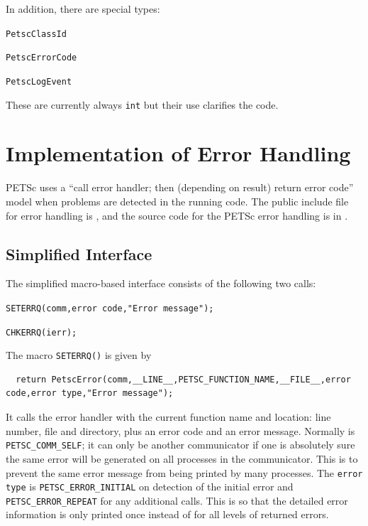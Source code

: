 In addition, there are special types:
\begin{tightitemize}
  \item \lstinline{PetscClassId}
  \item \lstinline{PetscErrorCode}
  \item \lstinline{PetscLogEvent}
\end{tightitemize}
These are currently always \lstinline{int} but their use clarifies the code.

\section{Implementation of Error Handling}

PETSc  uses a ``call error handler; then (depending on result) return
error code'' model when problems are detected in the running code.
The public include file for error handling is
 \href{http://www.mcs.anl.gov/petsc/petsc-master/include/petscerror.h.html}{}, 
 and the source code for the PETSc error handling is in .

\subsection{Simplified Interface}

The simplified macro-based interface consists of the following two calls:
\begin{tightitemize}
  \item \lstinline{SETERRQ(comm,error code,"Error message");}
  \item \lstinline{CHKERRQ(ierr);}
\end{tightitemize}

The macro \lstinline{SETERRQ()} is given by
\begin{lstlisting}
  return PetscError(comm,__LINE__,PETSC_FUNCTION_NAME,__FILE__,error code,error type,"Error message");
\end{lstlisting}
It calls the error handler with the current function name and location: line number,
file and directory, plus an error code and an error message. 
Normally  is \lstinline{PETSC_COMM_SELF}; it can only be another communicator if
one is absolutely sure the same error will be generated on all processes in the communicator. 
This is to prevent the same error message from being printed by many processes. 
The \lstinline{error type} is \lstinline{PETSC_ERROR_INITIAL} on detection of the initial error and \lstinline{PETSC_ERROR_REPEAT} for any additional calls. 
This is so that the detailed error information is only printed once instead of for all levels of returned errors.

